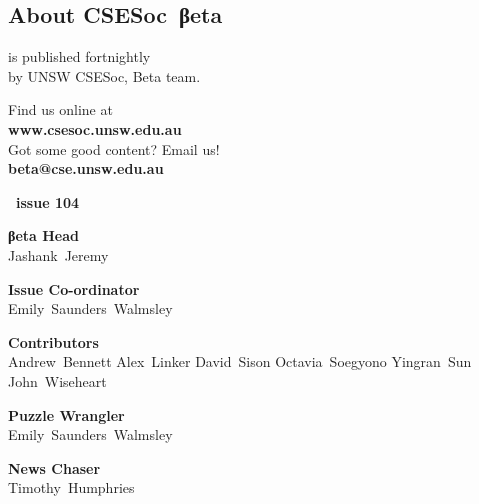 \documentclass[twoside]{article}
\date{30 March 2015}
\makeatletter
\gdef\the@year{2015}
\gdef\the@issue{104}
\makeatother
\begin{document}

\newpage
\maketitle\thispagestyle{mag}
\begin{multicols}{2}\begingroup
\section*{About CSE{}Soc~βeta}\begin{center}
\csesocbeta{} is published fortnightly\\
by UNSW CSESoc, Beta team.
\par Find us online at\\
\textbf{www.csesoc.unsw.edu.au}\\
Got some good content? Email us!\\
\textbf{beta@cse.unsw.edu.au}\\
\vspace{1em}\par
{\Large\bf\makeatletter \the@year\ issue \the@issue}
\par{\bf\sffamily βeta Head}\\ Jashank~Jeremy
\par{\bf\sffamily Issue Co-ordinator}\\ Emily~Saunders~Walmsley
\par{\bf\sffamily Contributors}\\
  Andrew~Bennett\hsp{}
  Alex~Linker\hsp{}
  David~Sison\hsp{}
  Octavia~Soegyono\hsp{}
  Yingran~Sun\hsp{}
  John~Wiseheart\hsp{}
\par{\bf\sffamily Puzzle Wrangler}\\ Emily~Saunders~Walmsley
\par{\bf\sffamily News Chaser}\\ Timothy~Humphries
\end{center}

\malcontents\raggedcolumns\vfill\columnbreak
\endgroup


\end{multicols}
\end{document}
